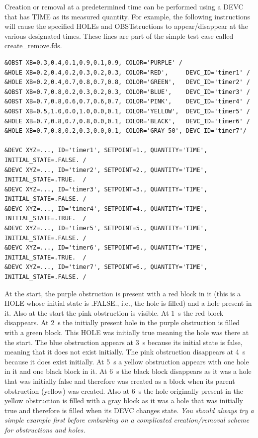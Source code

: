 \documentclass[11pt]{book}
\begin{document}
Creation or removal at a predetermined time can be performed using a {\ct DEVC} that has {\ct TIME} as its measured quantity. For example, the following instructions will cause the specified {\ct HOLE}s and {\ct OBST}structions to appear/disappear at the various designated times. These lines are part of the simple test case called {\ct create\_remove.fds}.
\begin{lstlisting}
&OBST XB=0.3,0.4,0.1,0.9,0.1,0.9, COLOR='PURPLE' /
&HOLE XB=0.2,0.4,0.2,0.3,0.2,0.3, COLOR='RED',     DEVC_ID='timer1' /
&HOLE XB=0.2,0.4,0.7,0.8,0.7,0.8, COLOR='GREEN',   DEVC_ID='timer2' /
&OBST XB=0.7,0.8,0.2,0.3,0.2,0.3, COLOR='BLUE',    DEVC_ID='timer3' /
&OBST XB=0.7,0.8,0.6,0.7,0.6,0.7, COLOR='PINK',    DEVC_ID='timer4' /
&OBST XB=0.5,1.0,0.0,1.0,0.0,0.1, COLOR='YELLOW',  DEVC_ID='timer5' /
&HOLE XB=0.7,0.8,0.7,0.8,0.0,0.1, COLOR='BLACK',   DEVC_ID='timer6' /
&HOLE XB=0.7,0.8,0.2,0.3,0.0,0.1, COLOR='GRAY 50', DEVC_ID='timer7'/

&DEVC XYZ=..., ID='timer1', SETPOINT=1., QUANTITY='TIME', INITIAL_STATE=.FALSE. /
&DEVC XYZ=..., ID='timer2', SETPOINT=2., QUANTITY='TIME', INITIAL_STATE=.TRUE.  /
&DEVC XYZ=..., ID='timer3', SETPOINT=3., QUANTITY='TIME', INITIAL_STATE=.FALSE. /
&DEVC XYZ=..., ID='timer4', SETPOINT=4., QUANTITY='TIME', INITIAL_STATE=.TRUE.  /
&DEVC XYZ=..., ID='timer5', SETPOINT=5., QUANTITY='TIME', INITIAL_STATE=.FALSE. /
&DEVC XYZ=..., ID='timer6', SETPOINT=6., QUANTITY='TIME', INITIAL_STATE=.TRUE.  /
&DEVC XYZ=..., ID='timer7', SETPOINT=6., QUANTITY='TIME', INITIAL_STATE=.FALSE. /
\end{lstlisting}
At the start, the purple obstruction is present with a red block in it (this is a {\ct HOLE} whose initial state is {\ct .FALSE.}, i.e., the hole is filled) and a hole present in it.  Also at the start the pink obstruction is visible.  At 1~s the red block disappears.  At 2~s the initially present hole in the purple obstruction is filled with a green block.  This {\ct HOLE} was initially true meaning the hole was there at the start.  The blue obstruction appears at 3~s because its initial state is false, meaning that it does not exist initially. The pink obstruction disappears at 4~s because it does exist initially. At 5~s a yellow obstruction appears with one hole in it and one black block in it.  At 6~s the black block disappears as it was a hole that was initially false and therefore was created as a block when its parent obstruction (yellow) was created.  Also at 6~s the hole originally present in the yellow obstruction is filled with a gray block as it was a hole that was initially true and therefore is filled when its {\ct DEVC} changes state.  {\em You should always try a simple example first before embarking on a complicated creation/removal scheme for obstructions and holes.}
\end{document}
